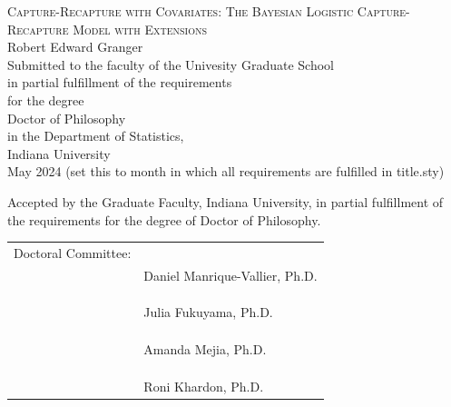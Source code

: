 \documentclass[
  12pt,
]{article}
\author{}
\date{\vspace{-2.5em}}
\begin{document}
\allsectionsfont{\normalsize\bfseries}

\begin{center}
\vspace*{.5in} %
\doublespacing
\Large{\textsc{Capture-Recapture with Covariates: The Bayesian Logistic Capture-Recapture Model with Extensions}}\\
\vspace*{5\baselineskip}
\normalsize{Robert Edward Granger}\\
\vspace*{7.5\baselineskip}
\singlespacing
\normalsize{Submitted to the faculty of the Univesity Graduate School \\
in partial fulfillment of the requirements \\
for the degree \\
Doctor of Philosophy \\
in the Department of Statistics, \\
Indiana University \\
May 2024 (set this to month in which all requirements are fulfilled in title.sty)}
\end{center}

\hypersetup{linkcolor = black}
\thispagestyle{empty}
\newpage

\singlespacing

Accepted by the Graduate Faculty, Indiana University, in partial fulfillment of the requirements for the degree of Doctor of Philosophy.

\vspace*{6\baselineskip}

\begin{tabular}
{>{\raggedright\arraybackslash}p{1.5in}
 >{\raggedleft\arraybackslash}p{4.75in}}
Doctoral Committee: & \hrulefill \\
& Daniel Manrique-Vallier, Ph.D. \\
\\
\\
& \hrulefill \\
& Julia Fukuyama, Ph.D. \\
\\
\\
& \hrulefill \\
& Amanda Mejia, Ph.D. \\
\\
\\
& \hrulefill \\
& Roni Khardon, Ph.D. \\
\end{tabular}
\end{document}
